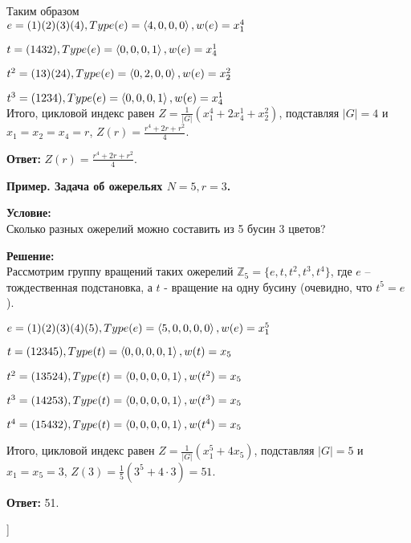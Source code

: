 Таким образом\\
$e = (1)(2)(3)(4), \space Type(e) = \left< 4, 0, 0, 0\right>, \space w(e) = x_{1}^{4}$

$t = (1432), \space Type(e) = \left< 0, 0, 0, 1\right>, \space w(e) = x_{4}^{1}$

$t^{2} = (13)(24), \space Type(e) = \left< 0, 2, 0, 0\right>, \space w(e) = x_{2}^{2}$

$t^{3} = (1234), \space Type(e) = \left< 0, 0, 0, 1\right>, \space w(e) = x_{4}^{1}$\\

Итого, цикловой индекс равен $Z = \frac{1}{|G|} (x_{1}^{4} + 2x_{4}^{1} + x_{2}^{2})$, подставляя $|G| = 4$ и $x_{1} = x_{2} = x_{4} = r$, $Z(r) = \frac{r^{4}+2r+r^{2}}{4}$.

\textbf{Ответ:} $Z(r) = \frac{r^{4}+2r+r^{2}}{4}$.


\textbf{Пример. Задача об ожерельях $N = 5, r = 3$.}

\textbf{Условие:}\\
Сколько разных ожерелий можно составить из 5 бусин 3 цветов?

\textbf{Решение:}\\
Рассмотрим группу вращений таких ожерелий $\mathbb{Z}_{5} = \{e, t, t^{2}, t^{3}, t^{4}\}$, где $e$ -- тождественная подстановка, а $t$ - вращение на одну бусину (очевидно, что $t^5 = e$).

$e = (1)(2)(3)(4)(5), \space Type(e) = \left< 5, 0, 0, 0, 0\right>, \space w(e) = x_{1}^{5}$

$t = (12345), \space Type(t) = \left< 0, 0, 0, 0, 1\right>, \space w(t) = x_{5}$

$t^2 = (13524), \space Type(t) = \left< 0, 0, 0, 0, 1\right>, \space w(t^2) = x_{5}$

$t^3 = (14253), \space Type(t) = \left< 0, 0, 0, 0, 1\right>, \space w(t^3) = x_{5}$

$t^4 = (15432), \space Type(t) = \left< 0, 0, 0, 0, 1\right>, \space w(t^4) = x_{5}$

Итого, цикловой индекс равен $Z = \frac{1}{|G|} (x_{1}^{5} + 4x_{5})$, подставляя $|G| = 5$ и $x_{1} = x_{5} = 3$, $Z(3) = \frac{1}{5} (3^5 + 4 \cdot 3) = 51$.

\textbf{Ответ:} 51.


\bigbreak
[\cite[page 132-161]{gurov_23}]
